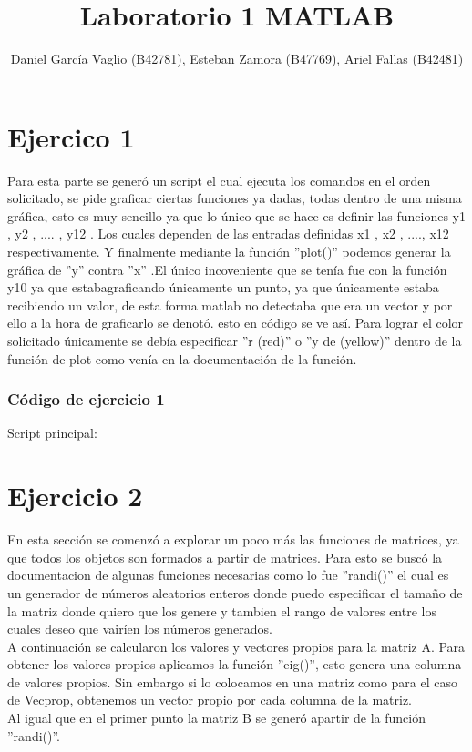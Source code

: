 \documentclass[12pt,letterpaper]{article}
\begin{document}
\title{Laboratorio 1 MATLAB}
\author{Daniel García Vaglio (B42781), Esteban Zamora (B47769), Ariel Fallas (B42481)}
\maketitle

\section{Ejercico 1}


Para esta parte se generó un script el cual ejecuta los comandos en el orden solicitado, se pide graficar ciertas funciones ya dadas, todas dentro de una misma gráfica, esto es muy sencillo ya que lo único que se hace es definir las funciones y1 , y2 , .... , y12 . Los cuales dependen de las entradas definidas x1 , x2 , ...., x12 respectivamente. Y finalmente mediante la función ''plot()'' podemos generar la gráfica de ''y'' contra ''x'' .El único incoveniente que se tenía fue con la función y10 ya que estabagraficando únicamente un punto, ya que únicamente estaba recibiendo un valor, de esta forma matlab no detectaba que era un vector y por ello a la hora de graficarlo se denotó.  esto en código se ve así.
Para lograr el color solicitado únicamente se debía especificar ''r (red)'' o ''y de (yellow)'' dentro de la función de plot como venía en la documentación de la función.

\subsubsection{Código de ejercicio 1}


Script principal:




\section{Ejercicio 2}
En esta sección se comenzó a explorar un poco más las funciones de matrices, ya que todos los objetos son formados a partir de matrices. Para esto se buscó la documentacion de algunas funciones necesarias como lo fue ''randi()'' el cual es un generador de números aleatorios enteros donde puedo especificar el tamaño de la matriz donde quiero que los genere y tambien el rango de valores entre los cuales deseo que vairíen los números generados.\\
A continuación se calcularon los valores y vectores propios para la matriz A. Para obtener los valores propios aplicamos la función ''eig()'', esto genera una columna de valores propios. Sin embargo si lo colocamos en una matriz como para el caso de Vecprop, obtenemos un vector propio por cada columna de la matriz.\\
Al igual que en el primer punto la matriz B se generó apartir de la función ''randi()''.
\end{document}
